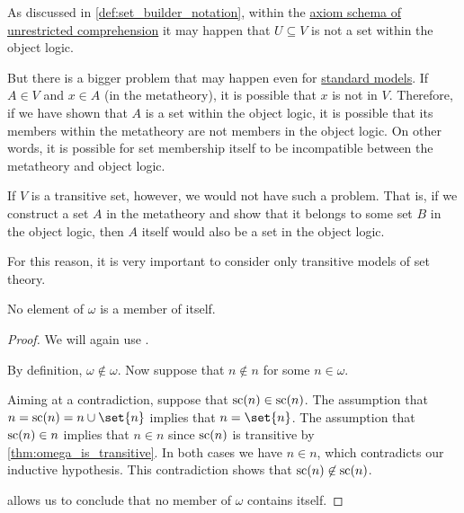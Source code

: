 \begin{remark}\label{rem:transitive_model_of_set_theory}
  As discussed in \cref{def:set_builder_notation}, within the \hyperref[def:naive_set_theory/unrestricted_comprehension]{axiom schema of unrestricted comprehension} it may happen that \( U \subseteq V \) is not a set within the object logic.

  But there is a bigger problem that may happen even for \hyperref[rem:standard_model_of_set_theory]{standard models}. If \( A \in V \) and \( x \in A \) (in the metatheory), it is possible that \( x \) is not in \( V \). Therefore, if we have shown that \( A \) is a set within the object logic, it is possible that its members within the metatheory are not members in the object logic. On other words, it is possible for set membership itself to be incompatible between the metatheory and object logic.

  If \( V \) is a transitive set, however, we would not have such a problem. That is, if we construct a set \( A \) in the metatheory and show that it belongs to some set \( B \) in the object logic, then \( A \) itself would also be a set in the object logic.

  For this reason, it is very important to consider only transitive models of set theory.
\end{remark}

\begin{lemma}\label{thm:members_of_omega_do_not_contain_themselves}
  No element of \( \omega \) is a member of itself.
\end{lemma}
\begin{proof}
  We will again use .

  By definition, \( \omega \not\in \omega \). Now suppose that \( n \not\in n \) for some \( n \in \omega \).

  Aiming at a contradiction, suppose that \( \op{sc}(n) \in \op{sc}(n) \). The assumption that \( n = \op{sc}(n) = n \cup \set{ n } \) implies that \( n = \set{ n } \). The assumption that \( \op{sc}(n) \in n \) implies that \( n \in n \) since \( \op{sc}(n) \) is transitive by \cref{thm:omega_is_transitive}. In both cases we have \( n \in n \), which contradicts our inductive hypothesis. This contradiction shows that \( \op{sc}(n) \not\in \op{sc}(n) \).

   allows us to conclude that no member of \( \omega \) contains itself.
\end{proof}


